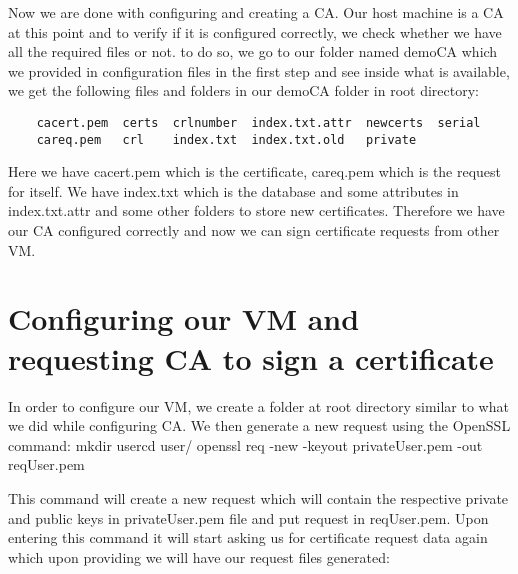 \documentclass[11pt]{article}
\begin{document}
Now we are done with configuring and creating a CA. Our host machine is a CA at this point and to verify if it is configured correctly, we check whether we have all the required files or not. to do so, we go to our folder named demoCA which we provided in configuration files in the first step and see inside what is available, we get the following files and folders in our demoCA folder in root directory:
\begin{verbatim}
	cacert.pem  certs  crlnumber  index.txt.attr  newcerts  serial
	careq.pem   crl    index.txt  index.txt.old   private

\end{verbatim}

Here we have cacert.pem which is the certificate, careq.pem which is the request for itself. We have index.txt which is the database and some attributes in index.txt.attr and some other folders to store new certificates. Therefore we have our CA configured correctly and now we can sign certificate requests from other VM.

\section{Configuring our VM and requesting CA to sign a certificate}
In order to configure our VM, we create a folder at root directory similar to what we did while configuring CA. We then generate a new request using the OpenSSL command: \newline \newline mkdir user\newline \newline cd user/ \newline \newline openssl req -new -keyout privateUser.pem -out reqUser.pem \newline \newline

This command will create a new request which will contain the respective  private and public keys in privateUser.pem file and put request in reqUser.pem. Upon entering this command it will start asking us for certificate request data again which upon providing we will have our request files generated:
\end{document}
